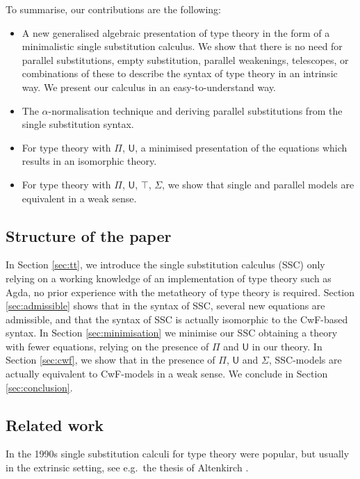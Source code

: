 \documentclass[sigplan,10pt,anonymous,review]{acmart}\settopmatter{printfolios=true,printccs=false,printacmref=false}
\newcommand{\U}{\mathsf{U}}
\begin{document}
To summarise, our contributions are the following:
\begin{itemize}
\item A new generalised algebraic presentation of type theory in the
  form of a minimalistic single substitution calculus. We show that
  there is no need for parallel substitutions, empty substitution,
  parallel weakenings, telescopes, or combinations of these to
  describe the syntax of type theory in an intrinsic way. We present
  our calculus in an easy-to-understand way.
\item The $\alpha$-normalisation technique and deriving parallel
  substitutions from the single substitution syntax.
\item For type theory with $\Pi$, $\U$, a minimised presentation of
  the equations which results in an isomorphic theory.
\item For type theory with $\Pi$, $\U$, $\top$, $\Sigma$, we show that
  single and parallel models are equivalent in a weak sense.
\end{itemize}

\subsection{Structure of the paper}

In Section \ref{sec:tt}, we introduce the single substitution calculus
(SSC) only relying on a working knowledge of an implementation of type
theory such as Agda, no prior experience with the metatheory of type
theory is required. Section \ref{sec:admissible} shows that in the
syntax of SSC, several new equations are admissible, and that the
syntax of SSC is actually isomorphic to the CwF-based syntax. In
Section \ref{sec:minimisation} we minimise our SSC obtaining a theory
with fewer equations, relying on the presence of $\Pi$ and $\U$ in our
theory. In Section \ref{sec:cwf}, we show that in the presence of
$\Pi$, $\U$ and $\Sigma$, SSC-models are actually equivalent to
CwF-models in a weak sense. We conclude in Section
\ref{sec:conclusion}.

\subsection{Related work}

In the 1990s single substitution calculi for type theory were popular,
but usually in the extrinsic setting, see e.g.\ the thesis of
Altenkirch \cite{alti:phd93}.
\end{document}
